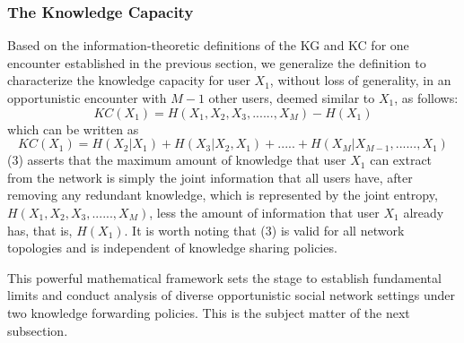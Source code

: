 \documentclass[conference]{IEEEtran}
\theoremstyle{definition}
\begin{document}
\subsubsection{The Knowledge Capacity}
\vspace{-0.2 cm}
Based on the information-theoretic definitions of the KG and KC for one encounter established in the previous section, we generalize the definition to characterize the knowledge capacity for user $X_1$, without loss of generality, in an opportunistic encounter with $M-1$ other users, deemed similar to $X_1$, as follows: 
\begin{equation}
		KC(X_1) = H(X_1, X_2, X_3, ......, X_M) - H(X_1)
\end{equation}
%
which can be written as
\vspace{-0.2 cm}
\begin{equation}
KC(X_1) = H(X_2|X_1) + H(X_3|X_2,X_1) + .....+ H(X_M|X_{M-1}, ......, X_1)
\end{equation}
(3) asserts that the maximum amount of knowledge that user $X_1$ can extract from the network is simply the joint information that all users have, after removing any redundant knowledge, which is represented by the joint entropy, $H(X_1, X_2, X_3, ......, X_M)$, less the amount of information that user $X_1$ already has, that is, $H(X_1)$. It is worth noting that (3) is valid for all network topologies and is independent of knowledge sharing policies.

This powerful mathematical framework sets the stage to establish fundamental limits 
and conduct analysis of diverse opportunistic social network settings under two 
knowledge forwarding policies. This is the subject matter of the next subsection.
\vspace{-0.5 cm}
\end{document}
